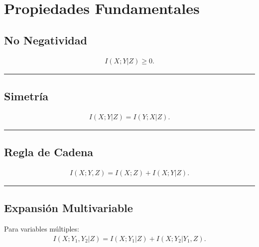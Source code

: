 \documentclass[letterpaper,10pt,english]{jupyterBook}
\begin{document}
\section{Propiedades Fundamentales}
\label{\detokenize{03_multivariate_models/conditional_mi:propiedades-fundamentales}}

\subsection{No Negatividad}
\label{\detokenize{03_multivariate_models/conditional_mi:no-negatividad}}\begin{equation*}
\begin{split}
I(X;Y|Z)\ge 0.
\end{split}
\end{equation*}

\bigskip\hrule\bigskip



\subsection{Simetría}
\label{\detokenize{03_multivariate_models/conditional_mi:simetria}}\begin{equation*}
\begin{split}
I(X;Y|Z)=I(Y;X|Z).
\end{split}
\end{equation*}

\bigskip\hrule\bigskip



\subsection{Regla de Cadena}
\label{\detokenize{03_multivariate_models/conditional_mi:regla-de-cadena}}\begin{equation*}
\begin{split}
I(X;Y,Z)
=
I(X;Z)
+
I(X;Y|Z).
\end{split}
\end{equation*}

\bigskip\hrule\bigskip



\subsection{Expansión Multivariable}
\label{\detokenize{03_multivariate_models/conditional_mi:expansion-multivariable}}
\sphinxAtStartPar
Para variables múltiples:
\begin{equation*}
\begin{split}
I(X;Y_1,Y_2|Z)
=
I(X;Y_1|Z)
+
I(X;Y_2|Y_1,Z).
\end{split}
\end{equation*}
\end{document}
